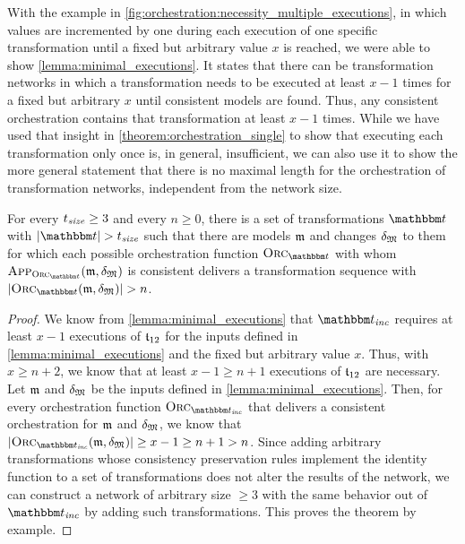 With the example in \autoref{fig:orchestration:necessity_multiple_executions}, in which values are incremented by one during each execution of one specific transformation until a fixed but arbitrary value $x$ is reached, we were able to show \autoref{lemma:minimal_executions}.
It states that there can be transformation networks in which a transformation needs to be executed at least $x-1$ times for a fixed but arbitrary $x$ until consistent models are found.
Thus, any consistent orchestration contains that transformation at least $x-1$ times.
While we have used that insight in \autoref{theorem:orchestration_single} to show that executing each transformation only once is, in general, insufficient, we can also use it to show the more general statement that there is no maximal length for the orchestration of transformation networks, independent from the network size.

\begin{theorem}
    \label{theorem:orchestration_fixed}
    For every $t_{\mathit{size}} \geq 3$ and every $n \geq 0$, there is a set of transformations $\transformationset{T}$ with $\abs{\transformationset{T}} > t_\mathvariable{size}$ such that there are models $\modeltuple{m}$ and changes $\changetuple{\metamodeltuple{M}}$ to them for which each possible orchestration function $\orcfunction{\transformationset{T}}$ with whom $\appfunction{\orcfunction{\transformationset{T}}}(\modeltuple{m}, \changetuple{\metamodeltuple{M}})$ is consistent delivers a transformation sequence with $\abs{\orcfunction{\transformationset{T}}(\modeltuple{m}, \changetuple{\metamodeltuple{M}})} > n$.
\end{theorem}

\begin{proof}
    We know from \autoref{lemma:minimal_executions} that $\transformationset{T}_\mathvariable{inc}$ requires at least $x-1$ executions of $\transformation{t}_{12}$ for the inputs defined in \autoref{lemma:minimal_executions} and the fixed but arbitrary value $x$.
    Thus, with $x \geq n+2$, we know that at least $x-1 \geq n+1$ executions of $\transformation{t}_{12}$ are necessary.
    Let $\modeltuple{m}$ and $\changetuple{\metamodeltuple{M}}$ be the inputs defined in \autoref{lemma:minimal_executions}.
    Then, for every orchestration function $\orcfunction{\transformationset{T}_\mathvariable{inc}}$ that delivers a consistent orchestration for $\modeltuple{m}$ and $\changetuple{\metamodeltuple{M}}$, we know that $\abs{\orcfunction{\transformationset{T}_\mathvariable{inc}}(\modeltuple{m}, \changetuple{\metamodeltuple{M}})} \geq x-1 \geq n+1 > n$.
    Since adding arbitrary transformations whose consistency preservation rules implement the identity function to a set of transformations does not alter the results of the network, we can construct a network of arbitrary size $\geq 3$ with the same behavior out of $\transformationset{T}_\mathvariable{inc}$ by adding such transformations.
    This proves the theorem by example.
\end{proof}

